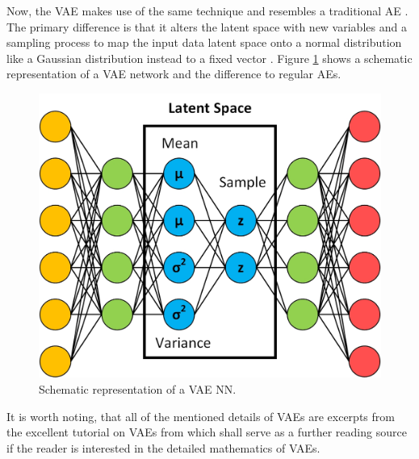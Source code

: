\documentclass[MGS,Master,english]{twbook}%
\begin{document}
Now, the \ac{VAE} makes use of the same technique and resembles a traditional \ac{AE} \cite{ml::vae::tutorial}. The primary difference is that it alters the latent space with new variables and a sampling process to map the input data latent space onto a normal distribution like a Gaussian distribution instead to a fixed vector \cite{ml::vae::tutorial}. Figure \ref{fig::vae} shows a schematic representation of a \ac{VAE} network and the difference to regular \acp{AE}. 
\begin{figure}[!htbp]
	\centering
	\includegraphics[width=0.65\linewidth]{PICs/NNs/variational_autoencoder}
	\caption{Schematic representation of a \ac{VAE} \ac{NN}.} \label{fig::vae}
\end{figure}

It is worth noting, that all of the mentioned details of \acp{VAE} are excerpts from the excellent tutorial on \acp{VAE} from \citep{ml::vae::tutorial} which shall serve as a further reading source if the reader is interested in the detailed mathematics of \acp{VAE}.
\end{document}
